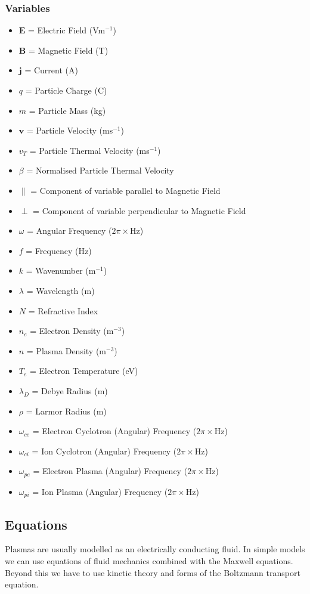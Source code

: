\subsubsection{Variables}
\begin{itemize}
	\item[] $\bm{E}$ = Electric Field (Vm$^{-1}$)
	\item[] $\bm{B}$ = Magnetic Field (T)
	\item[] $\bm{j}$ = Current (A)
	\item[] $q$ = Particle Charge (C)
	\item[] $m$ = Particle Mass (kg)
	\item[] $\bm{v}$ = Particle Velocity (ms$^{-1}$)
	\item[] $v_T$ = Particle Thermal Velocity (ms$^{-1}$)
	\item[] $\beta$ = Normalised Particle Thermal Velocity
	\item[] $\parallel$ = Component of variable parallel to Magnetic Field
	\item[] $\perp$ = Component of variable perpendicular to Magnetic Field
	\item[] $\omega$ = Angular Frequency ($2\pi \times$Hz)
	\item[] $f$ = Frequency (Hz)
	\item[] $k$ = Wavenumber (m$^{-1}$)
	\item[] $\lambda$ = Wavelength (m)
	\item[] $N$ = Refractive Index
	\item[] $n_e$ = Electron Density (m$^{-3}$)
	\item[] $n$ = Plasma Density (m$^{-3}$)
	\item[] $T_e$ = Electron Temperature (eV)
	\item[] $\lambda_D$ = Debye Radius (m)
	\item[] $\rho$ = Larmor Radius (m)
	\item[] $\omega_{ce}$ = Electron Cyclotron (Angular) Frequency ($2\pi \times$Hz)
	\item[] $\omega_{ci}$ = Ion Cyclotron (Angular) Frequency ($2\pi \times$Hz)
	\item[] $\omega_{pe}$ = Electron Plasma (Angular) Frequency ($2\pi \times$Hz)
	\item[] $\omega_{pi}$ = Ion Plasma (Angular) Frequency ($2\pi \times$Hz)
\end{itemize}

\subsection{Equations}
Plasmas are usually modelled as an electrically conducting fluid. In simple models we can use equations of fluid mechanics combined with the Maxwell equations. Beyond this we have to use kinetic theory and forms of the Boltzmann transport equation.


